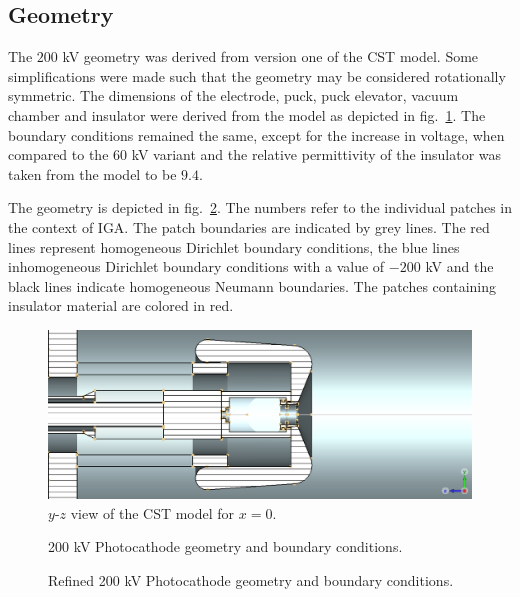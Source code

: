 \subsection{Geometry}
The $200$ kV geometry was derived from version one of the CST model. Some simplifications were made such that the geometry may be considered rotationally symmetric. The dimensions of the electrode, puck, puck elevator, vacuum chamber and insulator were derived from the model as depicted in fig.~\ref{fig:cst_geometry_yz}. The boundary conditions remained the same, except for the increase in voltage, when compared to the $60$ kV variant and the relative permittivity of the insulator was taken from the model to be $9.4$.

The geometry is depicted in fig.~\ref{fig:200kV_geometry}. The numbers refer to the individual patches in the context of IGA. The patch boundaries are indicated by grey lines. The red lines represent homogeneous Dirichlet boundary conditions, the blue lines inhomogeneous Dirichlet boundary conditions with a value of $-200$ kV and the black lines indicate homogeneous Neumann boundaries.
The patches containing insulator material are colored in red.

\begin{center}
\begin{figure}[H]
  \includegraphics[width=\textwidth]{figures/200kV/v1_cutx}
  \caption{$y$-$z$ view of the CST model for $x=0$.}
  \label{fig:cst_geometry_yz}
\end{figure}
\end{center}

\begin{center}
\begin{figure}[H]
  \caption{200 kV Photocathode geometry and boundary conditions.}
  \label{fig:200kV_geometry}
\end{figure}
\end{center}

\begin{center}
\begin{figure}[H]
  
  \caption{Refined 200 kV Photocathode geometry and boundary conditions.}
  \label{fig:200kV_geometry_v3}
\end{figure}
\end{center}

